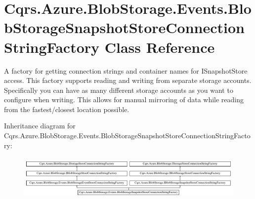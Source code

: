 \hypertarget{classCqrs_1_1Azure_1_1BlobStorage_1_1Events_1_1BlobStorageSnapshotStoreConnectionStringFactory}{}\section{Cqrs.\+Azure.\+Blob\+Storage.\+Events.\+Blob\+Storage\+Snapshot\+Store\+Connection\+String\+Factory Class Reference}
\label{classCqrs_1_1Azure_1_1BlobStorage_1_1Events_1_1BlobStorageSnapshotStoreConnectionStringFactory}


A factory for getting connection strings and container names for I\+Snapshot\+Store access. This factory supports reading and writing from separate storage accounts. Specifically you can have as many different storage accounts as you want to configure when writing. This allows for manual mirroring of data while reading from the fastest/closest location possible.  


Inheritance diagram for Cqrs.\+Azure.\+Blob\+Storage.\+Events.\+Blob\+Storage\+Snapshot\+Store\+Connection\+String\+Factory\+:\begin{figure}[H]
\begin{center}
\leavevmode
\includegraphics[height=2.262626cm]{classCqrs_1_1Azure_1_1BlobStorage_1_1Events_1_1BlobStorageSnapshotStoreConnectionStringFactory}
\end{center}
\end{figure}
